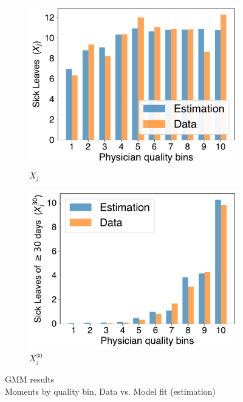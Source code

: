 \documentclass[../main.tex]{subfiles}
\begin{document}
\begin{figure}[H]
    \centering
    \begin{subfigure}[b]{0.46\linewidth}
        \centering
        \includegraphics[width=\linewidth]{result_x.pdf}
        
        \caption{$X_j$}

    \end{subfigure}
    \hspace{0.05\linewidth}  %
    \begin{subfigure}[b]{0.46\linewidth}
        \centering
        \includegraphics[width=\linewidth]{result_x30.pdf}
        
        \caption{$X_j^{30}$}
    \end{subfigure}


\caption{GMM results \\ Moments by quality bin, Data vs. Model fit (estimation)}
\label{fig:moments}
\end{figure}
\end{document}
